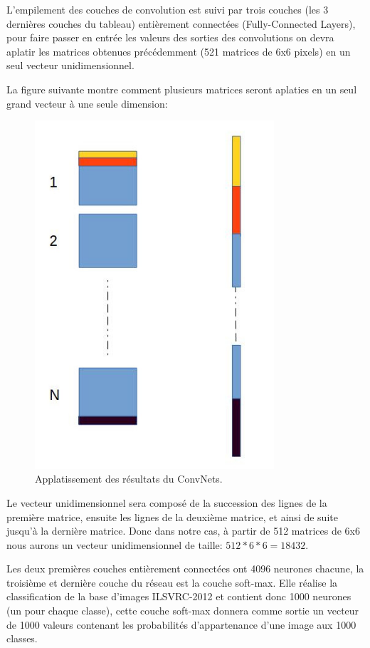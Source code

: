 	L'empilement des couches de convolution est suivi par trois couches (les 3 dernières couches du tableau) entièrement connectées (Fully-Connected Layers), pour faire passer en entrée les valeurs des sorties des convolutions on devra aplatir les matrices obtenues précédemment (521 matrices de 6x6 pixels) en un seul vecteur unidimensionnel.
	
	La figure suivante montre comment plusieurs matrices seront aplaties en un seul grand vecteur à une seule dimension:

\begin{figure}[H]
	\centering
		\includegraphics[width=3.5in]{Figures/flattening.jpg}
	\caption[An Electron]{Applatissement des résultats du ConvNets.}
	\label{fig:Electron}
\end{figure}

	Le vecteur unidimensionnel sera composé de la succession des lignes de la première matrice, ensuite les lignes de la deuxième matrice, et ainsi de suite jusqu'à la dernière matrice. Donc dans notre cas, à partir de 512 matrices de 6x6 nous aurons un vecteur unidimensionnel de taille: $512*6*6 = 18432$.

Les deux premières couches entièrement connectées ont 4096 neurones chacune, la troisième et dernière couche du réseau est la couche soft-max. Elle réalise la classification de la base d'images ILSVRC-2012 et contient donc 1000 neurones (un pour chaque classe), cette couche soft-max donnera comme sortie un vecteur de 1000 valeurs contenant les probabilités d'appartenance d'une image aux 1000 classes.

